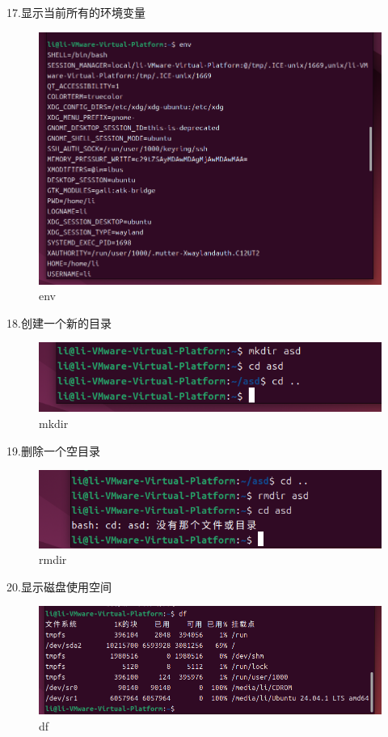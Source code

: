 \documentclass[a4paper, 12pt]{article}
\begin{document}
17.显示当前所有的环境变量
\begin{figure}[H]
  \centering
  \includegraphics[width=1\textwidth]{屏幕截图 2024-09-05 231711.png}
  \caption{env}
    \end{figure}

    \newpage
18.创建一个新的目录 
   \begin{figure}[H]
  \centering
  \includegraphics[width=1\textwidth]{屏幕截图 2024-09-05 232120.png}
  \caption{mkdir }
    \end{figure}
19.删除一个空目录
   \begin{figure}[H]
  \centering
  \includegraphics[width=1\textwidth]{屏幕截图 2024-09-05 232156.png}
  \caption{rmdir}
    \end{figure}
    
20.显示磁盘使用空间
    \begin{figure}[H]
  \centering
  \includegraphics[width=1\textwidth]{屏幕截图 2024-09-05 232224.png}
  \caption{df}
    \end{figure}
\end{document}
